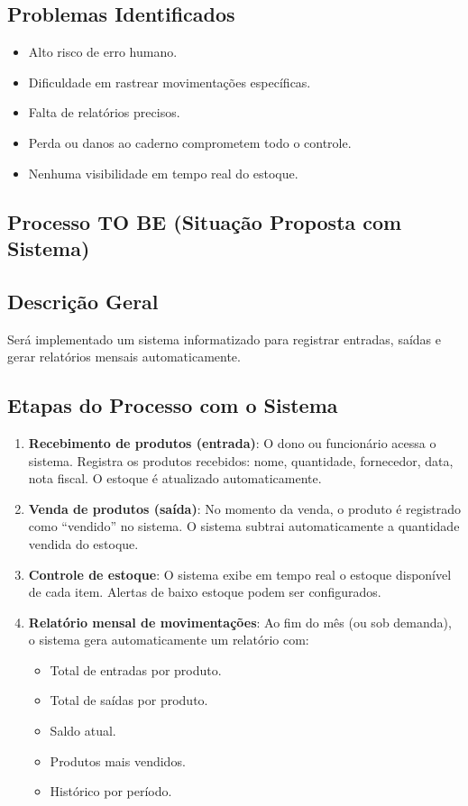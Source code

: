 \documentclass[
	12pt,				%
	openany,			%
	twoside,			%
	a4paper,			%
	english,			%
	brazil				%
	]{abntex2}
\begin{document}
\begin{apendicesenv}
\subsection*{Problemas Identificados}

\begin{itemize}
    \item Alto risco de erro humano.
    \item Dificuldade em rastrear movimentações específicas.
    \item Falta de relatórios precisos.
    \item Perda ou danos ao caderno comprometem todo o controle.
    \item Nenhuma visibilidade em tempo real do estoque.
\end{itemize}

\subsection{Processo TO BE (Situação Proposta com Sistema)}

\subsection*{Descrição Geral}
Será implementado um sistema informatizado para registrar entradas, saídas e gerar relatórios mensais automaticamente.

\subsection*{Etapas do Processo com o Sistema}

\begin{enumerate}
    \item \textbf{Recebimento de produtos (entrada)}: O dono ou funcionário acessa o sistema. Registra os produtos recebidos: nome, quantidade, fornecedor, data, nota fiscal. O estoque é atualizado automaticamente.

    \item \textbf{Venda de produtos (saída)}: No momento da venda, o produto é registrado como “vendido” no sistema. O sistema subtrai automaticamente a quantidade vendida do estoque.

    \item \textbf{Controle de estoque}: O sistema exibe em tempo real o estoque disponível de cada item. Alertas de baixo estoque podem ser configurados.

    \item \textbf{Relatório mensal de movimentações}: Ao fim do mês (ou sob demanda), o sistema gera automaticamente um relatório com:
    \begin{itemize}
        \item Total de entradas por produto.
        \item Total de saídas por produto.
        \item Saldo atual.
        \item Produtos mais vendidos.
        \item Histórico por período.
    \end{itemize}
\end{enumerate}


\end{apendicesenv}
\end{document}
